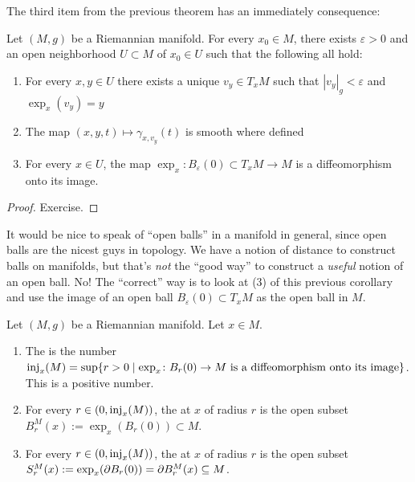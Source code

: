 The third item from the previous theorem has an immediately
consequence:

\begin{corollary}
Let $(M,g)$ be a Riemannian manifold. For every $x_{0}\in M$, there
exists $\varepsilon>0$ and an open neighborhood $U\subset M$ of
$x_{0}\in U$ such that the following all hold:
\begin{enumerate}
\item For every $x,y\in U$ there exists a unique $v_{y}\in T_{x}M$
  such that $|v_{y}|_{g}<\varepsilon$ and $\exp_{x}(v_{y})=y$
\item The map $(x,y,t)\mapsto\gamma_{x,v_{y}}(t)$ is smooth where defined
\item For every $x\in U$, the map $\exp_{x}\colon B_{\varepsilon}(0)\subset T_{x}M\to M$
  is a diffeomorphism onto its image.
\end{enumerate}
\end{corollary}

\begin{proof}
Exercise.
\end{proof}

\begin{node}
It would be nice to speak of ``open balls'' in a manifold in general,
since open balls are the nicest guys in topology. We have a notion of
distance to construct balls on manifolds, but that's \emph{not} the
``good way'' to construct a \emph{useful} notion of an open ball. No!
The ``correct'' way is to look at (3) of this previous corollary and
use the image of an open ball $B_{\varepsilon}(0)\subset T_{x}M$ as
the open ball in $M$.
\end{node}

\begin{definition}
Let $(M,g)$ be a Riemannian manifold. Let $x\in M$.
\begin{enumerate}
\item The  is the number
  $\operatorname{inj}_{x}(M)=\sup\{r>0\mid \exp_{x}\colon B_{r}(0)\to M\mbox{ is a diffeomorphism onto its image}\}$.
  This is a positive number.
\item For every $r\in(0,\operatorname{inj}_{x}(M))$, the  at
  $x$ of radius $r$ is the open subset
  $B^{M}_{r}(x):=\exp_{x}(B_{r}(0))\subset M$.
\item For every $r\in(0,\operatorname{inj}_{x}(M))$, the  at
  $x$ of radius $r$ is the open subset
  $S^{M}_{r}(x):=\exp_{x}(\partial B_{r}(0))=\partial B^{M}_{r}(x)\subseteq M$.
\end{enumerate}
\end{definition}

